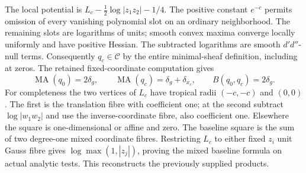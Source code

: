 \documentclass[11pt]{article}
\newcommand{\DD}{d'd''}
\newcommand{\MA}{\operatorname{MA}}
\newcommand{\C}{\mathcal C}
\begin{document}
The local potential is $L_c-\frac12\log|z_1z_2|-1/4$. The positive
constant $e^{-c}$ permits omission of every vanishing polynomial slot on
an ordinary neighborhood. The remaining slots are logarithms of units;
smooth convex maxima converge locally uniformly and have positive Hessian.
The subtracted logarithms are smooth $\DD$-null terms. Consequently
$q_c\in\C$ by the entire minimal-sheaf definition, including at zeros.
The retained fixed-coordinate computation gives
\[
 \MA(q_0)=2\delta_g,\qquad \MA(q_c)=\delta_g+\delta_{x_c},
 \qquad B(q_0,q_c)=2\delta_g.
\]
For completeness the two vertices of $L_c$ have tropical radii
$(-c,-c)$ and $(0,0)$. The first is the translation fibre with coefficient
one; at the second subtract $\log|w_1w_2|$ and use the inverse-coordinate
fibre, also coefficient one. Elsewhere the square is one-dimensional or
affine and zero. The baseline square is the sum of two degree-one mixed
coordinate fibres. Restricting $L_c$ to either fixed $z_i$ unit Gauss fibre
gives $\log\max(1,|z_j|)$, proving the mixed baseline formula on actual
analytic tests. This reconstructs the previously supplied products.
\end{document}
